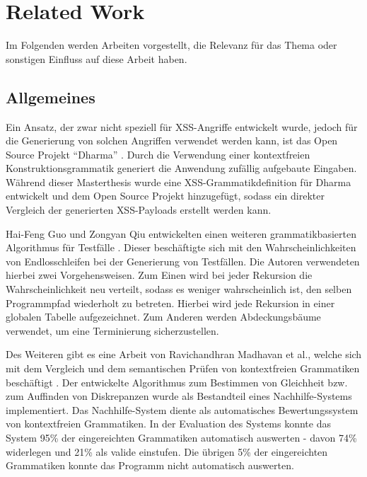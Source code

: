 \section{Related Work}\label{ssec:relatedWork}

Im Folgenden werden Arbeiten vorgestellt, die Relevanz für das Thema oder sonstigen Einfluss auf diese Arbeit haben.

\subsection{Allgemeines}\label{ssec:relatedCommon}

Ein Ansatz, der zwar nicht speziell für \ac{XSS}-Angriffe entwickelt wurde, jedoch für die Generierung von solchen Angriffen verwendet werden kann, ist das Open Source Projekt ``Dharma'' \cite{Diehl2015}. Durch die Verwendung einer kontextfreien Konstruktionsgrammatik generiert die Anwendung zufällig aufgebaute Eingaben. Während dieser Masterthesis wurde eine \ac{XSS}-Grammatikdefinition für Dharma entwickelt \cite{Borgardt2017} und dem Open Source Projekt hinzugefügt, sodass ein direkter Vergleich der generierten \ac{XSS}-Payloads erstellt werden kann.

Hai-Feng Guo und Zongyan Qiu entwickelten einen weiteren grammatikbasierten Algorithmus für Testfälle \cite{Eds2013}. Dieser beschäftigte sich mit den Wahrscheinlichkeiten von Endlosschleifen bei der Generierung von Testfällen. Die Autoren verwendeten hierbei zwei Vorgehensweisen. Zum Einen wird bei jeder Rekursion die Wahrscheinlichkeit neu verteilt, sodass es weniger wahrscheinlich ist, den selben Programmpfad wiederholt zu betreten. Hierbei wird jede Rekursion in einer globalen Tabelle aufgezeichnet. Zum Anderen werden Abdeckungsbäume verwendet, um eine Terminierung sicherzustellen.

Des Weiteren gibt es eine Arbeit von Ravichandhran Madhavan et al., welche sich mit dem Vergleich und dem semantischen Prüfen von kontextfreien Grammatiken beschäftigt \cite{Madhavan2015}. Der entwickelte Algorithmus zum Bestimmen von Gleichheit bzw. zum Auffinden von Diskrepanzen wurde als Bestandteil eines Nachhilfe-Systems implementiert. Das Nachhilfe-System diente als automatisches Bewertungssystem von kontextfreien Grammatiken. In der Evaluation des Systems konnte das System 95\% der eingereichten Grammatiken automatisch auswerten - davon 74\% widerlegen und 21\% als valide einstufen. Die übrigen 5\% der eingereichten Grammatiken konnte das Programm nicht automatisch auswerten.


